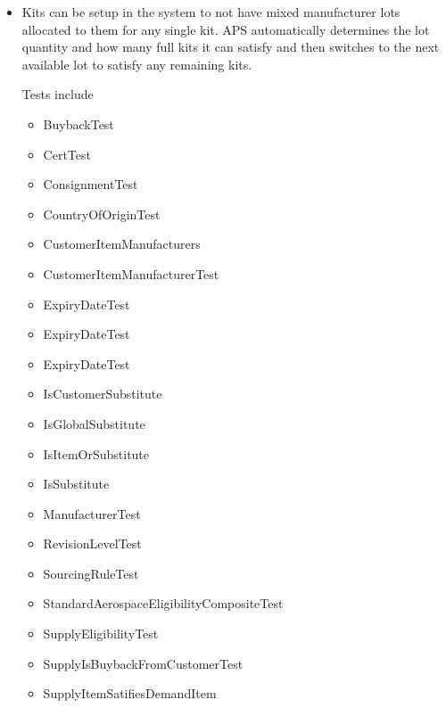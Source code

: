 \documentclass[letterpaper,10pt,english]{sphinxmanual}
\begin{document}
\begin{itemize}
\item {} 
Kits can be setup in the system to not have mixed manufacturer lots
allocated to them for any single kit. APS automatically determines
the lot quantity and how many full kits it can satisfy and then
switches to the next available lot to satisfy any remaining kits.

Tests include
\begin{itemize}
\item {} 
BuybackTest

\item {} 
CertTest

\item {} 
ConsignmentTest

\item {} 
CountryOfOriginTest

\item {} 
CustomerItemManufacturers

\item {} 
CustomerItemManufacturerTest

\item {} 
ExpiryDateTest

\item {} 
ExpiryDateTest

\item {} 
ExpiryDateTest

\item {} 
IsCustomerSubstitute

\item {} 
IsGlobalSubstitute

\item {} 
IsItemOrSubstitute

\item {} 
IsSubstitute

\item {} 
ManufacturerTest

\item {} 
RevisionLevelTest

\item {} 
SourcingRuleTest

\item {} 
StandardAerospaceEligibilityCompositeTest

\item {} 
SupplyEligibilityTest

\item {} 
SupplyIsBuybackFromCustomerTest

\item {} 
SupplyItemSatifiesDemandItem

\end{itemize}

\end{itemize}
\end{document}
